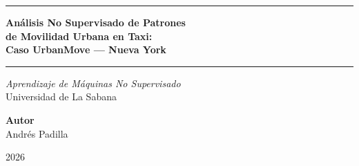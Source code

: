 \documentclass[12pt, a4paper]{article}
\begin{document}
\begin{titlepage}
  \centering
  \vspace*{1.5cm}

  {\color{azulprincipal}\rule{\linewidth}{1.5pt}}
  \vspace{0.4cm}

  {\Huge\bfseries\color{azulprincipal}
    Análisis No Supervisado de Patrones\\[6pt]
    de Movilidad Urbana en Taxi:\\[6pt]
    Caso UrbanMove --- Nueva York
  }

  \vspace{0.5cm}
  {\color{azulprincipal}\rule{\linewidth}{1.5pt}}

  \vspace{1.2cm}

  {\large\itshape Aprendizaje de Máquinas No Supervisado}\\[4pt]
  {\large Universidad de La Sabana}

  \vspace{2cm}

  {\large\bfseries Autor}\\[0.5cm]
  Andrés Padilla

  \vfill

  {\color{grisnota}\small 2026}
\end{titlepage}

\newpage
\begin{abstract}
\noindent
Este documento presenta los resultados de un análisis de aprendizaje no supervisado aplicado al conjunto de datos NYC Taxi Trip Duration, que registra 1{,}458{,}644 viajes realizados en la ciudad de Nueva York entre enero y junio de 2016. El objetivo central es identificar patrones latentes de demanda y comportamiento de viaje que permitan a UrbanMove, empresa de transporte bajo demanda, tomar decisiones operativas cuantificadas. Se aplicaron tres familias de métodos: análisis de información y entropía, segmentación por partición (K-means y DBSCAN), y modelado de mezclas gaussianas con el algoritmo EM. Los hallazgos revelan que la hora del día concentra casi toda su entropía posible (97{.}4\,\%), que cuatro segmentos espaciotemporales explican la estructura principal del servicio, y que la distribución de viajes responde a cuatro perfiles latentes con características operativas diferenciadas. Con base en estos resultados se formulan tres recomendaciones cuantificadas orientadas al posicionamiento de conductores, la tarificación diferencial y la modelización de demanda por régimen.
\end{abstract}
\end{document}
